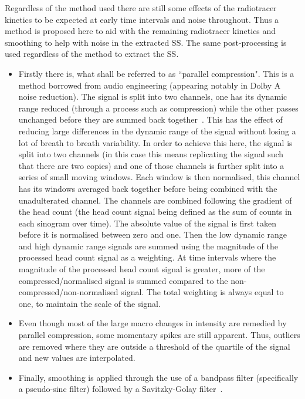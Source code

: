                 Regardless of the method used there are still some effects of the radiotracer kinetics to be expected at early time intervals and noise throughout. Thus a method is proposed here to aid with the remaining radiotracer kinetics and smoothing to help with noise in the extracted \gls{SS}. The same post-processing is used regardless of the method to extract the \gls{SS}.
                    
                \begin{itemize}
                    \item Firstly there is, what shall be referred to as ``parallel compression". This is a method borrowed from audio engineering (appearing notably in Dolby A noise reduction). The signal is split into two channels, one has its dynamic range reduced (through a process such as compression) while the other passes unchanged before they are summed back together~\parencite{Izhaki2012MixingTools}. This has the effect of reducing large differences in the dynamic range of the signal without losing a lot of breath to breath variability. In order to achieve this here, the signal is split into two channels (in this case this means replicating the signal such that there are two copies) and one of those channels is further split into a series of small moving windows. Each window is then normalised, this channel has its windows averaged back together before being combined with the unadulterated channel. The channels are combined following the gradient of the head count (the head count signal being defined as the sum of counts in each sinogram over time). The absolute value of the signal is first taken before it is normalised between zero and one. Then the low dynamic range and high dynamic range signals are summed using the magnitude of the processed head count signal as a weighting. At time intervals where the magnitude of the processed head count signal is greater, more of the compressed/normalised signal is summed compared to the non-compressed/non-normalised signal. The total weighting is always equal to one, to maintain the scale of the signal.
                        
                    \item Even though most of the large macro changes in intensity are remedied by parallel compression, some momentary spikes are still apparent. Thus, outliers are removed where they are outside a threshold of the quartile of the signal and new values are interpolated.
                        
                    \item Finally, smoothing is applied through the use of a bandpass filter (specifically a pseudo-sinc filter) followed by a Savitzky-Golay filter~\parencite{Savitzky1964SmoothingProcedures}.
                \end{itemize}

